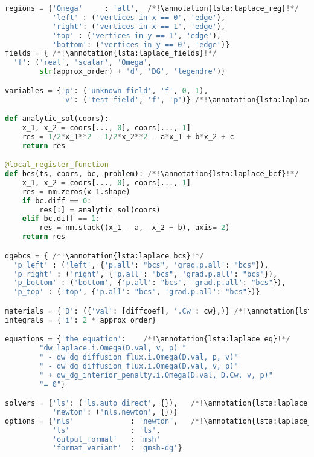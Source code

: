 \setcounter{lstannotation}{0}
\begin{lstlisting}[language=Python, caption=\pysauce{example\_dg\_laplace.py}, 
label={lst:laplace}]
regions = {'Omega'     : 'all',  /*!\annotation{lsta:laplace_reg}!*/
		   'left' : ('vertices in x == 0', 'edge'),
		   'right': ('vertices in x == 1', 'edge'),
		   'top' : ('vertices in y == 1', 'edge'),
		   'bottom': ('vertices in y == 0', 'edge')}
fields = { /*!\annotation{lsta:laplace_fields}!*/
  'f': ('real', 'scalar', 'Omega', 
        str(approx_order) + 'd', 'DG', 'legendre')}

variables = {'p': ('unknown field', 'f', 0, 1),
			 'v': ('test field', 'f', 'p')} /*!\annotation{lsta:laplace_vars}!*/

def analytic_sol(coors): 
	x_1, x_2 = coors[..., 0], coors[..., 1]
	res = 1/2*x_1**2 - 1/2*x_2**2 - a*x_1 + b*x_2 + c
	return res

@local_register_function
def bcs(ts, coors, bc, problem): /*!\annotation{lsta:laplace_bcf}!*/
	x_1, x_2 = coors[..., 0], coors[..., 1]
	res = nm.zeros(x_1.shape)
	if bc.diff == 0:
		res[:] = analytic_sol(coors)
	elif bc.diff == 1:
		res = nm.stack((x_1 - a, -x_2 + b), axis=-2)
	return res

dgebcs = { /*!\annotation{lsta:laplace_bcs}!*/
  'p_left' : ('left', {'p.all': "bcs", 'grad.p.all': "bcs"}),
  'p_right' : ('right', {'p.all': "bcs", 'grad.p.all': "bcs"}),
  'p_bottom' : ('bottom', {'p.all': "bcs", 'grad.p.all': "bcs"}),
  'p_top' : ('top', {'p.all': "bcs", 'grad.p.all': "bcs"})}

materials = {'D': ({'val': [diffcoef], '.Cw': cw},)} /*!\annotation{lsta:laplace_mat}!*/
integrals = {'i': 2 * approx_order}

equations = {'the_equation':    /*!\annotation{lsta:laplace_eq}!*/
		"dw_laplace.i.Omega(D.val, v, p) " 
	    " - dw_dg_diffusion_flux.i.Omega(D.val, p, v)" 
	    " - dw_dg_diffusion_flux.i.Omega(D.val, v, p)" 
	    " + dw_dg_interior_penalty.i.Omega(D.val, D.Cw, v, p)"
	    "= 0"}

solvers = {'ls': ('ls.auto_direct', {}),   /*!\annotation{lsta:laplace_solv}!*/
    	   'newton': ('nls.newton', {})}
options = {'nls'             : 'newton',   /*!\annotation{lsta:laplace_opts}!*/
	       'ls'              : 'ls',
		   'output_format'   : 'msh'
		   'format_variant'  : 'gmsh-dg'}
\end{lstlisting}


